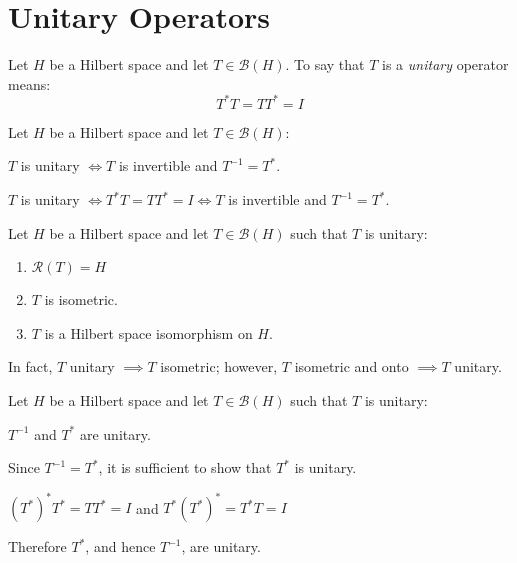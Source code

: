 \documentclass[letterpaper,12pt,fleqn]{article}
\newcommand{\mb}{\mathcal{B}}
\newcommand{\mr}{\mathcal{R}}
\begin{document}
\section*{Unitary Operators}

\begin{definition}[Unitary]
  Let $H$ be a Hilbert space and let $T\in\mb(H)$. To say that $T$ is a
  \emph{unitary} operator means:
  \[T^*T=TT^*=I\]
\end{definition}

\begin{theorem}
  Let $H$ be a Hilbert space and let $T\in\mb(H)$:

  \qquad$T$ is unitary $\iff T$ is invertible and $T^{-1}=T^*$.
\end{theorem}

\begin{theproof}
  $T$ is unitary $\iff T^*T=TT^*=I\iff T$ is invertible and $T^{-1}=T^*$.
\end{theproof}

\begin{properties}
  Let $H$ be a Hilbert space and let $T\in\mb(H)$ such that $T$ is unitary:
  \begin{enumerate}
  \item $\mr(T)=H$
  \item $T$ is isometric.
  \item $T$ is a Hilbert space isomorphism on $H$.
  \end{enumerate}
  In fact, $T$ unitary $\implies T$ isometric; however, $T$ isometric and onto
  $\implies T$ unitary.
\end{properties}

\begin{theorem}
  Let $H$ be a Hilbert space and let $T\in\mb(H)$ such that $T$ is unitary:

  \qquad$T^{-1}$ and $T^*$ are unitary.
\end{theorem}

\begin{theproof}
  Since $T^{-1}=T^*$, it is sufficient to show that $T^*$ is unitary.

  $(T^*)^*T^*=TT^*=I$ and $T^*(T^*)^*=T^*T=I$

  Therefore $T^*$, and hence $T^{-1}$, are unitary.
\end{theproof}
\end{document}
